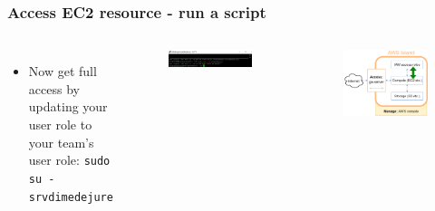 \documentclass[aspectratio=169]{beamer} %
\newcommand{\srvAcctName}{srvdimedejure}
\begin{document}
\begin{frame}
	\frametitle{Access EC2 resource - run a script}
	\begin{columns}[c]
		\begin{itemize}
			\item Now get full access by updating your user role to your team's user role: \newline \texttt{sudo su - \srvAcctName}
		\end{itemize}
		
		\begin{figure}
			\centering
			\includegraphics[width=\textwidth]{./img/access-4.png}
		\end{figure}
		
		\begin{figure}
			\centering
			\includegraphics[width=\textwidth]{./img/wb-aws-iam.png}
		\end{figure}
		
	\end{columns}
\end{frame}
\end{document}
